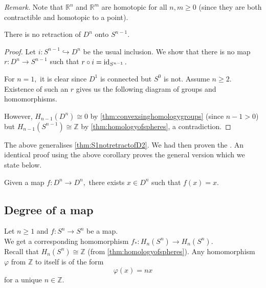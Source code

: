 \documentclass[12pt]{article}
\begin{document}
\emph{Remark.} Note that $\mathbb{R}^n$ and $\mathbb{R}^m$ are homotopic for all $n, m \ge 0$ (since they are both contractible and homotopic to a point).

\begin{cor}
	There is no retraction of $D^n$ onto $S^{n-1}.$
\end{cor}
\begin{proof} 
	Let $i:S^{n-1} \hookrightarrow D^n$ be the usual inclusion. We show that there is no map $r:D^n \to S^{n-1}$ such that $r\circ i = \operatorname{id}_{S^{n-1}}.$

	For $n = 1,$ it is clear since $D^1$ is connected but $S^{0}$ is not. Assume $n \ge 2.$ Existence of such an $r$ gives us the following diagram of groups and homomorphisms.

	\begin{center}
	\end{center}

	However, $H_{n-1}(D^n) \cong 0$ by \cref{thm:convexsinghomologygroups} (since $n - 1 > 0$) but $H_{n-1}(S^{n-1}) \cong \mathbb{Z}$ by \cref{thm:homologyofspheres}, a contradiction.
\end{proof}
The above generalises \cref{thm:S1notretractofD2}. We had then proven the . An identical proof using the above corollary proves the general version which we state below.

\begin{cor}
	Given a map $f:D^n \to D^n,$ there exists $x \in D^n$ such that $f(x) = x.$
\end{cor}

\subsection{Degree of a map}

Let $n \ge 1$ and $f:S^n \to S^n$ be a map. \\
We get a corresponding homomorphism $f_*:H_n(S^n) \to H_n(S^n).$\\
Recall that $H_n(S^n)\cong\mathbb{Z}$ (from \cref{thm:homologyofspheres}). Any homomorphism $\varphi$ from $\mathbb{Z}$ to itself is of the form
\begin{equation*} 
	\varphi(x) = nx
\end{equation*}
for a unique $n \in \mathbb{Z}.$ 
\end{document}
